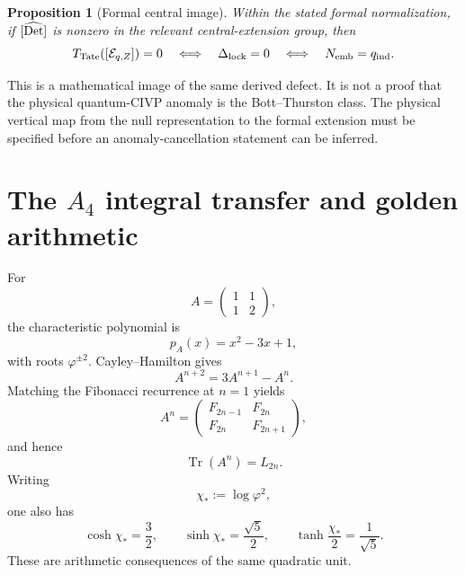 \documentclass[aps,prd,preprint,nofootinbib,superscriptaddress]{revtex4-2}
\newtheorem{proposition}[theorem]{Proposition}
\theoremstyle{definition}
\theoremstyle{remark}
\newcommand{\Tr}{\operatorname{Tr}}
\newcommand{\cE}{\mathcal E}
\begin{document}
\begin{proposition}[Formal central image]
Within the stated formal normalization, if
$[\widehat{\rm Det}]$ is nonzero in the relevant central-extension group,
then
\begin{equation}
T_{\rm Tate}([\cE_{q,Z}])=0
\quad\Longleftrightarrow\quad
\Delta_{\rm lock}=0
\quad\Longleftrightarrow\quad
N_{\rm emb}=q_{\rm ind}.
\end{equation}
\end{proposition}

This is a mathematical image of the same derived defect.  It is not a proof
that the physical quantum-CIVP anomaly is the Bott--Thurston class.  The
physical vertical map from the null representation to the formal extension
must be specified before an anomaly-cancellation statement can be inferred.

\section{The $A_4$ integral transfer and golden arithmetic}
\label{app:A4}

For
\begin{equation}
A=
\begin{pmatrix}
1&1\\
1&2
\end{pmatrix},
\end{equation}
the characteristic polynomial is
\begin{equation}
p_A(x)=x^2-3x+1,
\end{equation}
with roots $\varphi^{\pm2}$.  Cayley--Hamilton gives
\begin{equation}
A^{n+2}=3A^{n+1}-A^n.
\label{eq:Arecurrence}
\end{equation}
Matching the Fibonacci recurrence at $n=1$ yields
\begin{equation}
A^n
=
\begin{pmatrix}
F_{2n-1}&F_{2n}\\
F_{2n}&F_{2n+1}
\end{pmatrix},
\end{equation}
and hence
\begin{equation}
\Tr(A^n)=L_{2n}.
\end{equation}
Writing
\begin{equation}
\chi_*:=\log\varphi^2,
\end{equation}
one also has
\begin{equation}
\cosh\chi_*=\frac32,
\qquad
\sinh\chi_*=\frac{\sqrt5}{2},
\qquad
\tanh\frac{\chi_*}{2}=\frac1{\sqrt5}.
\end{equation}
These are arithmetic consequences of the same quadratic unit.
\end{document}
